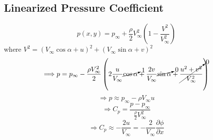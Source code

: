 \subsection{Linearized Pressure Coefficient}
\[
p(x,y) = p_\infty + \frac{\rho}{2}V_\infty^2\left(1-\frac{V^2}{V_\infty^2}\right)
\]
where $V^2 = \left(V_\infty\cos\alpha+u\right)^2 + \left(V_\infty\sin\alpha+v\right)^2$
\[
\Longrightarrow p =p_\infty - \frac{\rho V_\infty^2}{2}\left(2\frac{u}{V_\infty}\cancelto{1}{\cos\alpha} + \frac{2v}{V_\infty}\cancelto{0}{\sin\alpha} + \cancelto{0}{\frac{u^2+v^2}{V_\infty^2}}\right)
\]
\[
\Longrightarrow p\approx p_\infty - \rho V_\infty u
\]
\[
\Longrightarrow C_p = \frac{p-p_\infty}{\frac{\rho}{2}V_\infty^2}
\]
\begin{equation}
\Longrightarrow C_p\approx-\frac{2u}{V_\infty} = -\frac{2}{V_\infty}\frac{\partial\phi}{\partial x}
\label{eq: 6-1-13}
\end{equation}
